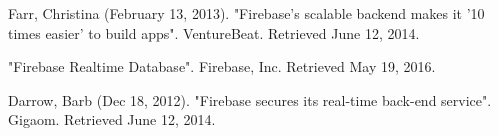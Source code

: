 \begin{thebibliography}{}

Farr, Christina (February 13, 2013). "Firebase's scalable backend makes it '10 times easier' to build apps". VentureBeat. Retrieved June 12, 2014.

 "Firebase Realtime Database". Firebase, Inc. Retrieved May 19, 2016.

Darrow, Barb (Dec 18, 2012). "Firebase secures its real-time back-end service". Gigaom. Retrieved June 12, 2014.

\end{thebibliography}






